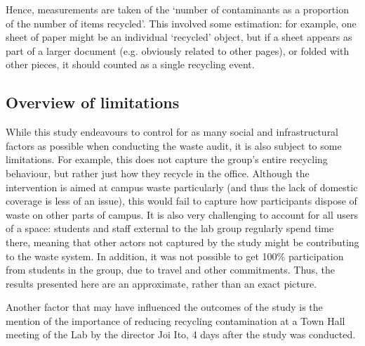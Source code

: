 \documentclass[nofonts,nols,justified,nobib]{tufte-book}
\begin{document}
Hence, measurements are taken of the ‘number of contaminants as a proportion of the number of items recycled’. This involved some estimation: for example, one sheet of paper might be an individual ‘recycled’ object, but if a sheet appears as part of a larger document (e.g. obviously related to other pages), or folded with other pieces, it should counted as a single recycling event. 


\subsection*{Overview of limitations}

While this study endeavours to control for as many social and infrastructural factors as possible when conducting the waste audit, it is also subject to some limitations. For example, this does not capture the group's entire recycling behaviour, but rather just how they recycle in the office. Although the intervention is aimed at campus waste particularly (and thus the lack of domestic coverage is less of an issue), this would fail to capture how participants dispose of waste on other parts of campus. It is also very challenging to account for all users of a space: students and staff external to the lab group regularly spend time there, meaning that other actors not captured by the study might be contributing to the waste system. In addition, it was not possible to get 100\% participation from students in the group, due to travel and other commitments. Thus, the results presented here are an approximate, rather than an exact picture.

Another factor that may have influenced the outcomes of the study is the mention of the importance of reducing recycling contamination at a Town Hall meeting of the Lab by the director Joi Ito, 4 days after the study was conducted.


\end{document}
